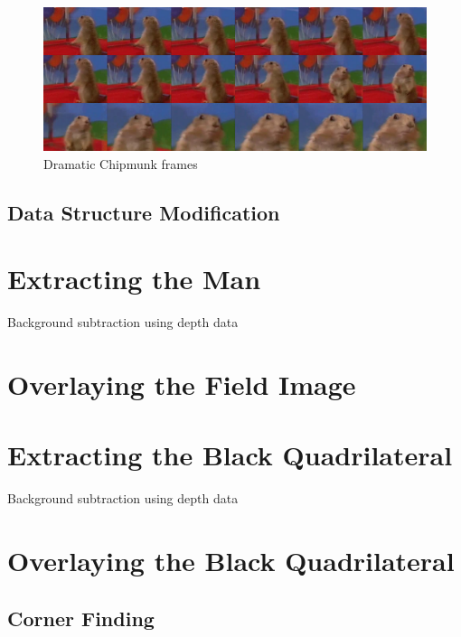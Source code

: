 \documentclass[parskip]{cs4rep}
\begin{document}
\begin{figure}[H]
\centering
\includegraphics[width=4.5in]{IntroImage2.jpg}
\caption{Dramatic Chipmunk frames}
\label{intro2}
\end{figure}

\section{Data Structure Modification}

\chapter{Extracting the Man}

Background subtraction using depth data

\chapter{Overlaying the Field Image}

\chapter{Extracting the Black Quadrilateral}

Background subtraction using depth data

\chapter{Overlaying the Black Quadrilateral}

\section{Corner Finding}
\end{document}
